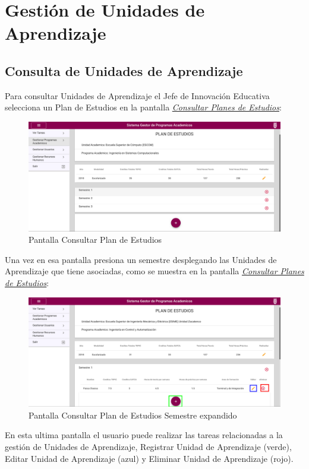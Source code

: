 \section{Gestión de Unidades de Aprendizaje}
    \subsection{Consulta de Unidades de Aprendizaje}
Para consultar Unidades de Aprendizaje el Jefe de Innovación Educativa selecciona un Plan de Estudios en la pantalla \hyperlink{consultarS}{\textit{Consultar Planes de Estudios}}:\\
\begin{figure}[H]
    \centering
    \hypertarget{consultarS}{\includegraphics[width=0.7\linewidth]{images/GUA/consultarS}}
    \caption{Pantalla Consultar Plan de Estudios}
    \label{consultarS}
\end{figure}
\clearpage
Una vez en esa pantalla presiona un semestre desplegando las Unidades de Aprendizaje que tiene asociadas, como se muestra en la pantalla \hyperlink{consultarUA}{\textit{Consultar Planes de Estudios}}:\\
\begin{figure}[H]
    \centering
    \hypertarget{consultarUA}{\includegraphics[width=0.7\linewidth]{images/GUA/consultarUA}}
    \caption{Pantalla Consultar Plan de Estudios Semestre expandido}
    \label{consultarUA}
\end{figure}
En esta ultima pantalla el usuario puede realizar las tareas relacionadas a la gestión de Unidades de Aprendizaje, Registrar Unidad de Aprendizaje (verde), Editar Unidad de Aprendizaje (azul) y Eliminar Unidad de Aprendizaje (rojo).
\clearpage
